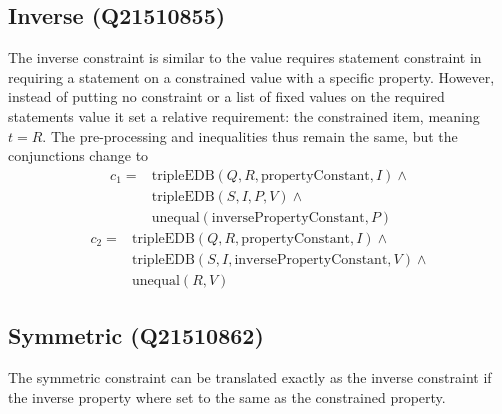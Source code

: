 \documentclass[hyperref,bachelorofscience,fleqn]{cgvpub}
\begin{document}
\subsection{Inverse (Q21510855)}
The inverse constraint is similar to the value requires statement constraint in requiring a statement on a constrained value with a specific property. However, instead of putting no constraint or a list of fixed values on the required statements value it set a relative requirement: the constrained item, meaning \(t = R\). The pre-processing and inequalities thus remain the same, but the conjunctions change to 
\begin{equation*}
\begin{split}
c_1 = &\text{tripleEDB}(Q, R, \text{propertyConstant}, I) \wedge \\
&\text{tripleEDB}(S, I, P, V) \wedge \\
&\text{unequal}(\text{inversePropertyConstant}, P)
\end{split}
\end{equation*}
\begin{equation*}
\begin{split}
c_2 = &\text{tripleEDB}(Q, R, \text{propertyConstant}, I) \wedge \\
&\text{tripleEDB}(S, I, \text{inversePropertyConstant}, V) \wedge \\
&\text{unequal}(R, V)
\end{split}
\end{equation*}

\subsection{Symmetric (Q21510862)}
The symmetric constraint can be translated exactly as the inverse constraint if the inverse property where set to the same as the constrained property.
\end{document}
